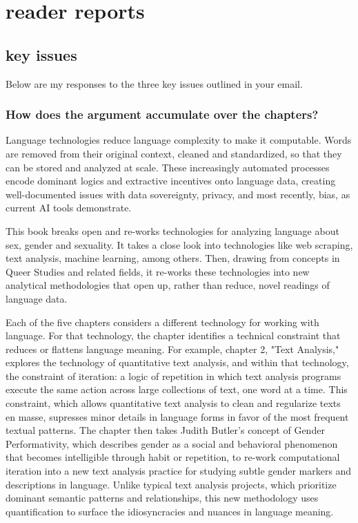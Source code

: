 \documentclass[11pt]{article}
\author{fcalado}
\date{\today}
\title{}
\begin{document}
\tableofcontents

\section{reader reports}
\label{sec:orgc264038}
\subsection{key issues}
\label{sec:orgd55bd10}

Below are my responses to the three key issues outlined in your email. 

\subsubsection{How does the argument accumulate over the chapters?}
\label{sec:orge4e3a49}
Language technologies reduce language complexity to make it
computable. Words are removed from their original context, cleaned and
standardized, so that they can be stored and analyzed at scale. These
increasingly automated processes encode dominant logics and extractive
incentives onto language data, creating well-documented issues with
data sovereignty, privacy, and most recently, bias, as current AI
tools demonstrate.

This book breaks open and re-works technologies for analyzing language
about sex, gender and sexuality. It takes a close look into
technologies like web scraping, text analysis, machine learning, among
others. Then, drawing from concepts in Queer Studies and related
fields, it re-works these technologies into new analytical
methodologies that open up, rather than reduce, novel readings of
language data.

Each of the five chapters considers a different technology for working
with language. For that technology, the chapter identifies a technical
constraint that reduces or flattens language meaning. For example,
chapter 2, "Text Analysis," explores the technology of quantitative
text analysis, and within that technology, the constraint of
iteration: a logic of repetition in which text analysis programs
execute the same action across large collections of text, one word at
a time. This constraint, which allows quantitative text analysis to
clean and regularize texts en masse, supresses minor details in
language forms in favor of the most frequent textual patterns. The
chapter then takes Judith Butler's concept of Gender Performativity,
which describes gender as a social and behavioral phenomenon that
becomes intelligible through habit or repetition, to re-work
computational iteration into a new text analysis practice for studying
subtle gender markers and descriptions in language. Unlike typical
text analysis projects, which prioritize dominant semantic patterns
and relationships, this new methodology uses quantification to surface
the idiosyncracies and nuances in language meaning.
\end{document}
